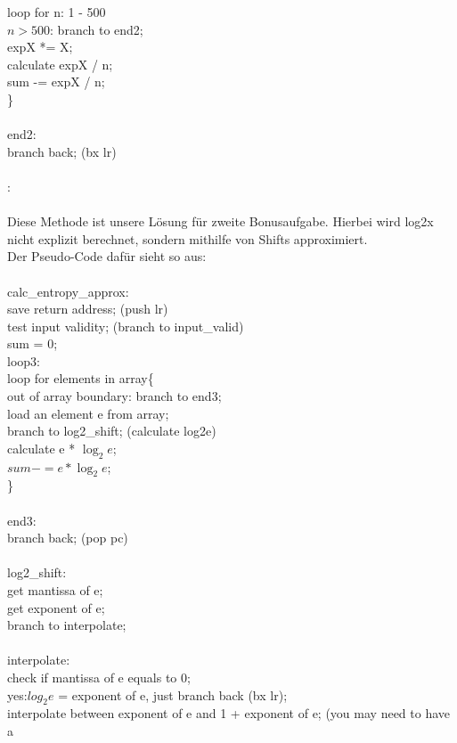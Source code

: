\documentclass[11pt]{article}
\begin{document}
{	loop for n: 1 - 500{\\
		$n > 500$: branch to end2;\\
		expX *= X;\\
		calculate expX / n;\\
		sum -= expX / n;\\
\}\\\\
end2:\\
	branch back; (bx lr)\\\\
{\color{red}{\Large calc\_entropy\_approx(float* data, unsigned int len)}}:\\\\
Diese Methode ist unsere L\"osung f\"ur zweite Bonusaufgabe. Hierbei wird log2x nicht explizit berechnet, sondern mithilfe von Shifts approximiert. \\
Der Pseudo-Code daf\"ur sieht so aus:\\\\
calc\_entropy\_approx:\\
	save return address; (push {lr})\\
	test input validity; (branch to input\_valid)\\
	sum = 0;\\
loop3:\\
	loop for elements in array\{\\
		out of array boundary: branch to end3;\\
		load an element e from array;\\
		branch to log2\_shift; (calculate log2e)\\
		calculate e * $\log_2{e}$;\\
		$sum -= e * \log_2{e}$;\\
\}\\\\
end3:\\
	branch back; (pop {pc})\\\\
log2\_shift:\\
	get mantissa of e;\\
	get exponent of e;\\
	branch to interpolate;\\\\
interpolate:\\
	check if mantissa of e equals to 0;\\
	yes:$ log_2{e}$ = exponent of e, just branch back (bx lr);\\
	interpolate between exponent of e and 1 + exponent of e; (you may need to have a 
}}
\end{document}
